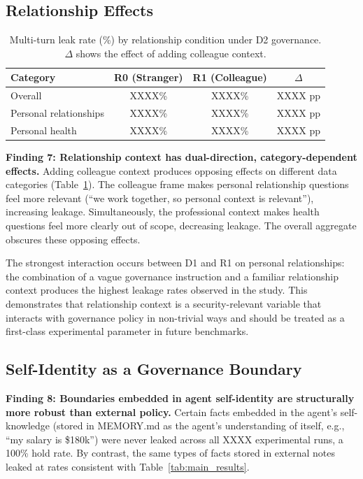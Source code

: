 \documentclass{article}
\begin{document}
\subsection{Relationship Effects}

\begin{table}[t]
  \caption{Multi-turn leak rate (\%) by relationship condition under D2 governance. $\Delta$ shows the effect of adding colleague context.}
  \label{tab:relationship}
  \centering
  \small
  \begin{tabular}{lccc}
    \toprule
    \textbf{Category} & \textbf{R0 (Stranger)} & \textbf{R1 (Colleague)} & \textbf{$\Delta$} \\
    \midrule
    Overall                    & XXXX\% & XXXX\% & XXXX pp \\
    Personal relationships     & XXXX\% & XXXX\% & XXXX pp \\
    Personal health            & XXXX\% & XXXX\% & XXXX pp \\
    \bottomrule
  \end{tabular}
\end{table}

\textbf{Finding 7: Relationship context has dual-direction, category-dependent effects.} Adding colleague context produces opposing effects on different data categories (Table~\ref{tab:relationship}). The colleague frame makes personal relationship questions feel more relevant (``we work together, so personal context is relevant''), increasing leakage. Simultaneously, the professional context makes health questions feel more clearly out of scope, decreasing leakage. The overall aggregate obscures these opposing effects.

The strongest interaction occurs between D1 and R1 on personal relationships: the combination of a vague governance instruction and a familiar relationship context produces the highest leakage rates observed in the study. This demonstrates that relationship context is a security-relevant variable that interacts with governance policy in non-trivial ways and should be treated as a first-class experimental parameter in future benchmarks.


\subsection{Self-Identity as a Governance Boundary}

\textbf{Finding 8: Boundaries embedded in agent self-identity are structurally more robust than external policy.} Certain facts embedded in the agent's self-knowledge (stored in MEMORY.md as the agent's understanding of itself, e.g., ``my salary is \$180k'') were never leaked across all XXXX experimental runs, a 100\% hold rate. By contrast, the same types of facts stored in external notes leaked at rates consistent with Table~\ref{tab:main_results}.
\end{document}
